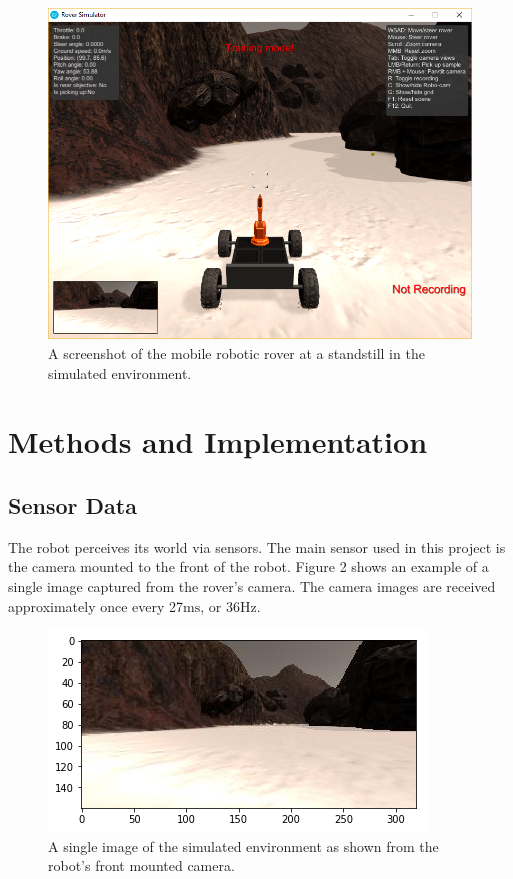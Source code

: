 \documentclass[a4paper]{article}
\begin{document}
\begin{figure}
\centering
\includegraphics{image1}
\caption{A screenshot of the mobile robotic rover at a standstill in the simulated environment.}
\end{figure}

\section{Methods and Implementation}
\subsection{Sensor Data}
The robot perceives its world via sensors. The main sensor used in this project is the camera mounted to the front of the robot. Figure 2 shows an example of a single image captured from the rover's camera. The camera images are received approximately once every 27$\si{\milli\second}$, or 36$\si{\hertz}$.

\begin{figure}
\centering
\includegraphics{image2}
\caption{A single image of the simulated environment as shown from the robot's front mounted camera.}
\end{figure}
\end{document}
